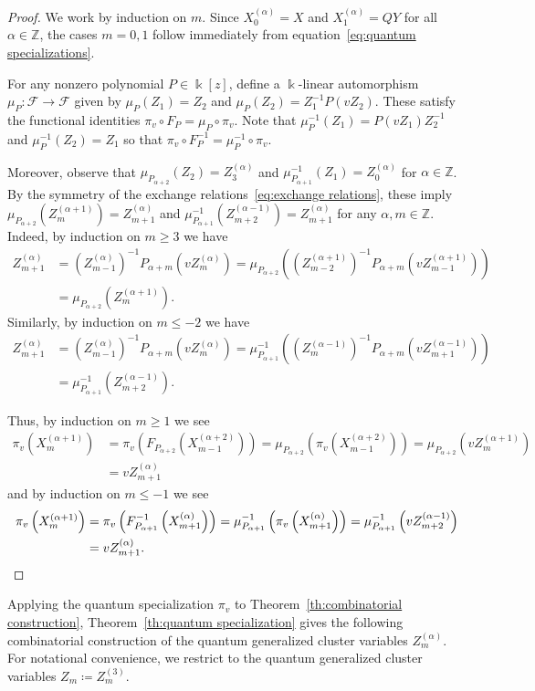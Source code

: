 \documentclass[ALCO,ThmDefs,Unicode,epreuves]{cedram}
\newcommand{\cF}{\mathcal{F}}
\newcommand{\kk}{\Bbbk}
\newcommand{\ZZ}{\mathbb{Z}}
\begin{document}
\begin{proof}
 We work by induction on $m$.
 Since $X^{(\alpha)}_0=X$ and $X^{(\alpha)}_1=QY$ for all $\alpha\in\ZZ$, the cases $m=0,1$ follow immediately from equation~\eqref{eq:quantum specializations}.

 For any nonzero polynomial $P\in\kk[z]$, define a $\kk$-linear automorphism $\mu_P:\cF\to\cF$ given by $\mu_P(Z_1)=Z_2$ and $\mu_P(Z_2)=Z_1^{-1}P(vZ_2)$.
 These satisfy the functional identities $\pi_v\circ F_P=\mu_P\circ\pi_v$.
 Note that $\mu_P^{-1}(Z_1)=P(vZ_1)Z_2^{-1}$ and $\mu_P^{-1}(Z_2)=Z_1$ so that $\pi_v\circ F_P^{-1}=\mu_P^{-1}\circ\pi_v$.
 
 Moreover, observe that $\mu_{P_{\alpha+2}}(Z_2)=Z^{(\alpha)}_3$ and $\mu_{P_{\alpha+1}}^{-1}(Z_1)=Z^{(\alpha)}_0$ for $\alpha\in\ZZ$.
 By the symmetry of the exchange relations~\eqref{eq:exchange relations}, these imply $\mu_{P_{\alpha+2}}(Z^{(\alpha+1)}_m)=Z^{(\alpha)}_{m+1}$ and $\mu_{P_{\alpha+1}}^{-1}(Z^{(\alpha-1)}_{m+2})=Z^{(\alpha)}_{m+1}$ for any $\alpha,m\in\ZZ$.
 Indeed, by induction on $m\ge3$ we have
 \begin{align*}
 Z^{(\alpha)}_{m+1}&=\left(Z^{(\alpha)}_{m-1}\right)^{-1}P_{\alpha+m}\left(vZ^{(\alpha)}_m\right)=\mu_{P_{\alpha+2}}\left(\left(Z^{(\alpha+1)}_{m-2}\right)^{-1}P_{\alpha+m}\left(vZ^{(\alpha+1)}_{m-1}\right)\right)\\
 &=\mu_{P_{\alpha+2}}\left(Z^{(\alpha+1)}_m\right).
 \end{align*}
 Similarly, by induction on $m\le-2$ we have
 \begin{align*}
Z^{(\alpha)}_{m+1}&=\left(Z^{(\alpha)}_{m-1}\right)^{-1}P_{\alpha+m}\left(vZ^{(\alpha)}_m\right)=\mu_{P_{\alpha+1}}^{-1}\left(\left(Z^{(\alpha-1)}_m\right)^{-1}P_{\alpha+m}\left(vZ^{(\alpha-1)}_{m+1}\right)\right)
\\
&=\mu_{P_{\alpha+1}}^{-1}\left(Z^{(\alpha-1)}_{m+2}\right).
 \end{align*}


 Thus, by induction on $m\ge1$ we see
 \begin{align*}
 \pi_v\left(X^{(\alpha+1)}_m\right)&=\pi_v\left(F_{P_{\alpha+2}}\left(X^{(\alpha+2)}_{m-1}\right)\right)=\mu_{P_{\alpha+2}}\left(\pi_v\left(X^{(\alpha+2)}_{m-1}\right)\right)=\mu_{P_{\alpha+2}}\left(vZ^{(\alpha+1)}_m\right)\\
 &=vZ^{(\alpha)}_{m+1}
 \end{align*}
 and by induction on $m\le-1$ we see
 \begin{align*}
 \pi_v\left(X^{(\alpha+1)}_m\right)&=\pi_v\left(F_{P_{\alpha+1}}^{-1}\left(X^{(\alpha)}_{m+1}\right)\right)=\mu_{P_{\alpha+1}}^{-1}\left(\pi_v\left(X^{(\alpha)}_{m+1}\right)\right)=\mu_{P_{\alpha+1}}^{-1}\left(vZ^{(\alpha-1)}_{m+2}\right)
 \\
 &=vZ^{(\alpha)}_{m+1}.\qedhere
 \end{align*}
\end{proof}
Applying the quantum specialization $\pi_v$ to Theorem~\ref{th:combinatorial construction}, Theorem~\ref{th:quantum specialization} gives the following combinatorial construction of the quantum generalized cluster variables $Z^{(\alpha)}_m$.
For notational convenience, we restrict to the quantum generalized cluster variables $Z_m\coloneqq Z^{(3)}_m$.
\end{document}
